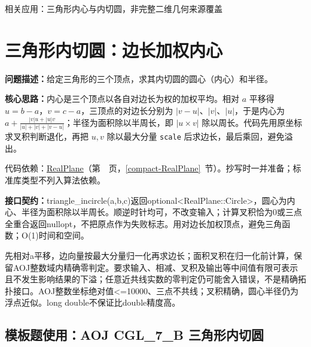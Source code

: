

\newpage

\Needspace{413pt}

\noindent 相关应用：三角形内心与内切圆，非完整二维几何来源覆盖

\section{三角形内切圆：边长加权内心}\label{compact-triangle_incircle}

\noindent\textbf{问题描述：}\allowbreak 给定三角形的三个顶点，求其内切圆的圆心（内心）和半径。

\textbf{核心思路：}\allowbreak 内心是三个顶点以各自对边长为权的加权平均。相对 $a$ 平移得 $u=b-a$，$v=c-a$，三顶点的对边长分别为 $|v-u|$、$|v|$、$|u|$，于是内心为 $a+\frac{|v|u+|u|v}{|u|+|v|+|v-u|}$；半径为面积除以半周长，即 $|u\times v|$ 除以周长。代码先用原坐标求叉积判断退化，再把 $u,v$ 除以最大分量 \texttt{scale} 后求边长，最后乘回，避免溢出。

代码依赖：\hyperref[compact-RealPlane]{RealPlane}（第~\pageref{compact-RealPlane}~页，\ref{compact-RealPlane}~节）。抄写时一并准备；标准库类型不列入算法依赖。

{\sloppy{}\noindent\textbf{接口契约：}triangle\_incircle(a,b,c)返回optional<RealPlane::Circle>，圆心为内心、半径为面积除以半周长。顺逆时针均可，不改变输入；计算叉积恰为0或三点全重合返回nullopt，不把原点作为失败标志。用对边长加权顶点，避免三角函数；O(1)时间和空间。

先相对a平移，边向量按最大分量归一化再求边长；面积叉积在归一化前计算，保留AOJ整数域内精确零判定。要求输入、相减、叉积及输出等中间值有限可表示且不发生影响结果的下溢；任意近共线实数的零判定仍可能舍入错误，不是精确拓扑接口。AOJ整数坐标绝对值<=10000、三点不共线；叉积精确，圆心半径仍为浮点近似。long double不保证比double精度高。\par}



\newpage

\Needspace{263pt}

\subsection*{模板题使用：AOJ CGL\_7\_B 三角形内切圆}

\label{usage-example-426}


